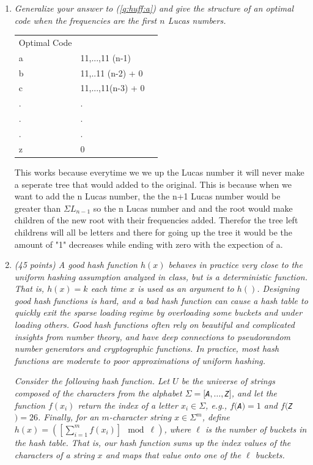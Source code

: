 \documentclass[12pt]{article}
\begin{document}
\begin{enumerate}
\begin{enumerate}
	\end{enumerate}

\item\textit{  Generalize your answer to (\ref{q:huff:a}) and give the structure of an optimal code when the frequencies are the first $n$ Lucas numbers.}
	


\begin{table}[]
\begin{tabular}{lll}
  Optimal Code \\
  a & 11,...,11 (n-1)  \\
  b & 11,..11 (n-2) + 0 \\
  c & 11,...,11(n-3) + 0 \\
  . & . \\
  . & . \\
  . & . \\
  z & 0
\end{tabular}
\end{table}
	
This works because everytime we we up the Lucas number it will never make a seperate tree that would added to the original. This is because when we want to add the n Lucas number, the the n+1 Lucas number would be greater than $\Sigma{L_{n-1}}$ so the n Lucas number and and the root would make children of the new root with their frequencies added. Therefor the tree left childrens will all be letters and there for going up the tree it would be the amount of "1" decreases while ending with zero with the expection of a.

\newpage

	\item \textit{ (45 points) A good hash function $h(x)$ behaves in practice very close to the uniform hashing assumption analyzed in class, but is a deterministic function. That is, $h(x)=k$ each time $x$ is used as an argument to $h()$. Designing good hash functions is hard, and a bad hash function can cause a hash table to quickly exit the sparse loading regime by overloading some buckets and under loading others. Good hash functions often rely on beautiful and complicated insights from number theory, and have deep connections to pseudorandom number generators and cryptographic functions. In practice, most hash functions are moderate to poor approximations of uniform hashing.}
	
	\smallskip \textit{ Consider the following hash function. Let $U$ be the universe of strings composed of the characters from the alphabet $\Sigma=[${\tt A}$,\dots,${\tt Z}$]$, and let the function $f(x_{i})$ return the index of a letter $x_{i}\in \Sigma$, e.g., $f(${\tt A}$)=1$ and $f(${\tt Z}$)=26$. Finally, for an $m$-character string $x\in \Sigma^{m}$, define $h(x) = \left(\left[\sum_{i=1}^{m}f(x_{i})\right]\!\! \mod \ell\right)$, where $\ell$ is the number of buckets in the hash table. That is, our hash function sums up the index values of the characters of a string $x$ and maps that value onto one of the $\ell$ buckets.}
	

\end{enumerate}
\end{document}
